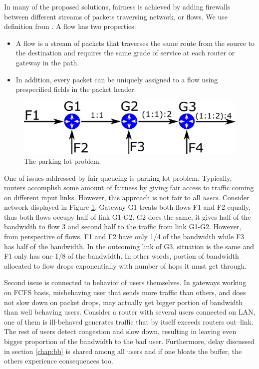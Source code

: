 In many of the proposed solutions, fairness is achieved by adding firewalls between different streams of packets traversing network, or flows. We use definition from \cite{Zhang:1990:VCN:99517.99525}. A flow has two properties:
\begin{itemize}
	\item A flow is a stream of packets that traverses the same route from the source to the destination and requires the	same grade of service at each router or gateway in the path.
	\item In addition, every packet can be uniquely assigned to a flow using prespecified fields in the packet header.
\end{itemize}
 
\begin{figure}
	\centering
	\includegraphics[width=137mm]{drawings/parking_lot}
	\caption{The parking lot problem.}
	
	\label{fig05:ParkingLot}
\end{figure}

One of issues addressed by fair queueing is parking lot problem. Typically, routers accomplish some amount of fairness by giving fair access to traffic coming on different input links. However, this approach is not fair to all \textit{users}. Consider network displayed in Figure \ref{fig05:ParkingLot}. Gateway G1 treats both flows F1 and F2 equally, thus both flows occupy half of link G1-G2. G2 does the same, it gives half of the bandwidth to flow 3 and second half to the traffic from link G1-G2. However, from perspective of flows, F1 and F2 have only 1/4 of the bandwidth while F3 has half of the bandwidth. In the outcoming link of G3, situation is the same and F1 only has one 1/8 of the bandwidth. In other words, portion of bandwidth allocated to flow drops exponentially with number of hops it must get through.

Second issue is connected to behavior of users themselves. In gateways working on FCFS basis, misbehaving user that sends more traffic than others, and does not slow down on packet drops, may actually get bigger portion of bandwidth than well behaving users. Consider a router with several users connected on LAN, one of them is ill-behaved generates traffic that by itself exceeds routers out--link. The rest of users detect congestion and slow down, resulting in leaving even bigger proportion of the bandwidth to the bad user. Furthermore, delay discussed in section \ref{chap:bb} is shared among all users and if one bloats the buffer, the others experience consequences too.

